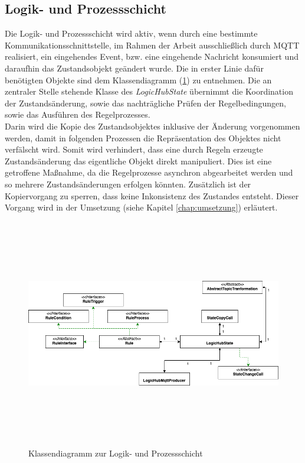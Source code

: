     \subsection{Logik- und Prozessschicht}
    \label{subsec:logikschicht}
    Die Logik- und Prozessschicht wird aktiv, wenn durch eine bestimmte Kommunikationsschnittstelle, im Rahmen der Arbeit ausschließlich durch \acs{MQTT} realisiert, ein eingehendes 
    Event, bzw. eine eingehende Nachricht konsumiert und daraufhin das Zustandsobjekt geändert wurde. Die in erster Linie dafür benötigten Objekte sind dem 
    Klassendiagramm (\ref{fig:patternlogik}) zu entnehmen. Die an zentraler Stelle stehende Klasse des \textit{LogicHubState} übernimmt die Koordination 
    der Zustandsänderung, sowie das nachträgliche Prüfen der Regelbedingungen, sowie das Ausführen des Regelprozesses. 
    \\
    Darin wird die Kopie des Zustandsobjektes inklusive der Änderung vorgenommen werden, damit in folgenden Prozessen die Repräsentation des Objektes nicht verfälscht wird. 
    Somit wird verhindert, dass eine durch Regeln erzeugte Zustandsänderung das eigentliche Objekt direkt manipuliert. Dies ist eine getroffene Maßnahme, da die Regelprozesse asynchron abgearbeitet werden 
    und so mehrere Zustandsänderungen erfolgen könnten. Zusätzlich ist der Kopiervorgang zu sperren, dass keine Inkonsistenz des Zustandes entsteht. 
    Dieser Vorgang wird in der Umsetzung (siehe Kapitel \ref{chap:umsetzung}) erläutert.
    \begin{figure}[hbt!]
        \centering
        \includegraphics[width=14cm,height=10cm,keepaspectratio]{images/Logikschicht_final.png}
        \caption{Klassendiagramm zur Logik- und Prozessschicht}
        \label{fig:patternlogik}
    \end{figure}
